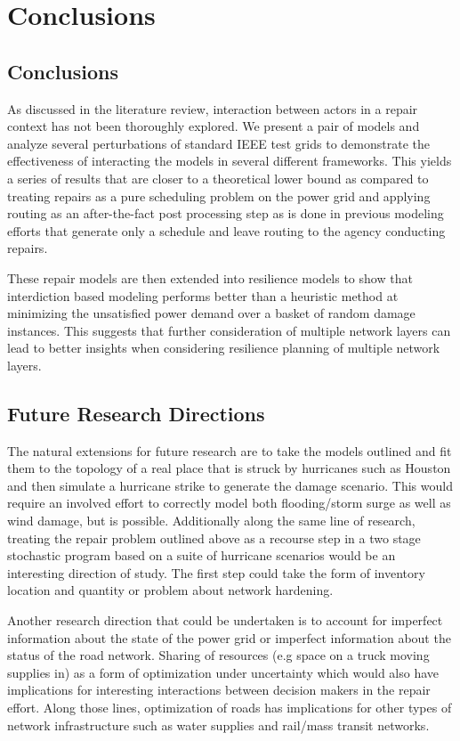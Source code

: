 \chapter{Conclusions}
%

	\section{Conclusions}

As discussed in the literature review, interaction between actors in a repair context has not been thoroughly explored. We present a pair of models and analyze several perturbations of standard IEEE test grids to demonstrate the effectiveness of interacting the models in several different frameworks. This yields a series of results that are closer to a theoretical lower bound as compared to treating repairs as a pure scheduling problem on the power grid and applying routing as an after-the-fact post processing step as is done in previous modeling efforts that generate only a schedule and leave routing to the agency conducting repairs.

These repair models are then extended into resilience models to show that interdiction based modeling performs better than a heuristic method at minimizing the unsatisfied power demand over a basket of random damage instances. This suggests that further consideration of multiple network layers can lead to better insights when considering resilience planning of multiple network layers.


\section{Future Research Directions}
The natural extensions for future research are to take the models outlined and fit them to the topology of a real place that is struck by hurricanes such as Houston and then simulate a hurricane strike to generate the damage scenario. This would require an involved effort to correctly model both flooding/storm surge as well as wind damage, but is possible. Additionally along the same line of research, treating the repair problem outlined above as a recourse step in a two stage stochastic program based on a suite of hurricane scenarios would be an interesting direction of study. The first step could take the form of inventory location and quantity or problem about network hardening.

Another research direction that could be undertaken is to account for imperfect information about the state of the power grid or imperfect information about the status of the road network. Sharing of resources (e.g space on a truck moving supplies in) as a form of optimization under uncertainty which would also have implications for interesting interactions between decision makers in the repair effort. Along those lines, optimization of roads has implications for other types of network infrastructure such as water supplies and rail/mass transit networks.